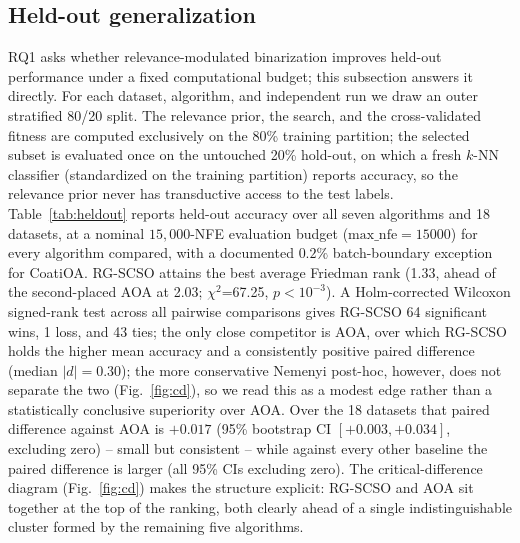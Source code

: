 \documentclass[preprint,3p,times]{elsarticle}
\begin{document}
\subsection{Held-out generalization}
\label{sec:heldout}
RQ1 asks whether relevance-modulated binarization improves held-out
performance under a fixed computational budget; this subsection answers it
directly. For each dataset, algorithm, and independent run we draw an outer
stratified 80/20 split. The relevance prior, the search, and the
cross-validated fitness are computed exclusively on the 80\% training
partition; the selected subset is evaluated once on the untouched 20\%
hold-out, on which a fresh $k$-NN classifier (standardized on the training
partition) reports accuracy, so the relevance prior never has transductive
access to the test labels. Table~\ref{tab:heldout} reports held-out
accuracy over all seven algorithms and 18 datasets, at a nominal
$15{,}000$-NFE evaluation budget ($\mathrm{max\_nfe}=15000$) for every
algorithm compared, with a documented $0.2\%$ batch-boundary exception for
CoatiOA.
RG-SCSO attains the best average Friedman rank (1.33, ahead of
the second-placed AOA at 2.03; $\chi^2$=67.25,
$p<10^{-3}$). A
Holm-corrected Wilcoxon signed-rank test across all pairwise comparisons gives
RG-SCSO 64 significant wins, 1 loss, and 43 ties; the only close
competitor is AOA, over which RG-SCSO holds the higher mean accuracy and a
consistently positive paired difference (median $|d|=0.30$); the
more conservative Nemenyi post-hoc, however, does not separate the two
(Fig.~\ref{fig:cd}), so we read this as a modest edge rather than a
statistically conclusive superiority over AOA. Over the
18 datasets that paired difference against AOA is $+0.017$ (95\%
bootstrap CI $[+0.003,+0.034]$, excluding zero) -- small but consistent --
while against every other baseline the paired difference
is larger (all 95\% CIs excluding zero).
The critical-difference diagram (Fig.~\ref{fig:cd}) makes the structure
explicit: RG-SCSO and AOA sit together at the top of the ranking, both clearly
ahead of a single indistinguishable cluster formed by the remaining five
algorithms.
\end{document}
